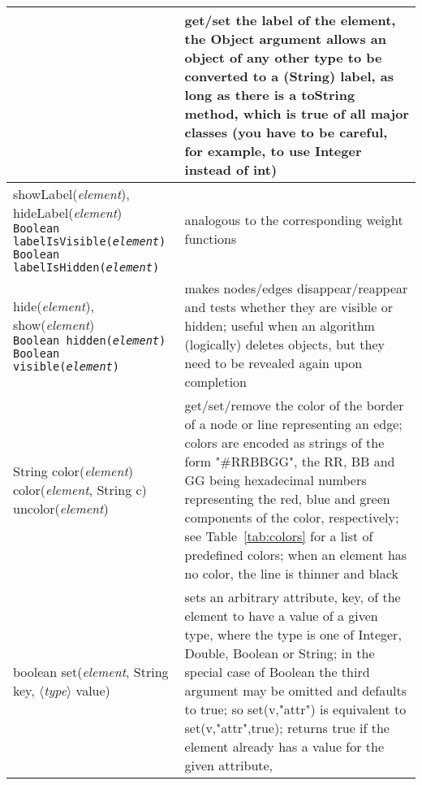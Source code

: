 \begin{table}
\begin{tabular}{| m{} | m{} |}
{    }
    &
    get/set the label of the element, the \textsf{Object} argument allows an object
    of any other type to be converted to a (\textsf{String}) label,
    as long as there is a \textsf{toString} method, which is true of all major classes
    (you have to be careful, for example, to use \textsf{Integer} instead of \textsf{int})
    \\ \hline
    \shortstack[l]{
      \textsf{showLabel(\emph{element})},
      \textsf{hideLabel(\emph{element})}\\
      \texttt{Boolean labelIsVisible(\emph{element})}\\
      \texttt{Boolean labelIsHidden(\emph{element})}
    }
    &
    analogous to the corresponding weight functions
    \\ \hline
    \shortstack[l]{
      \textsf{hide(\emph{element})},
      \textsf{show(\emph{element})}\\
      \texttt{Boolean hidden(\emph{element})}\\
      \texttt{Boolean visible(\emph{element})}
    }
    &
    makes nodes/edges disappear/reappear and tests whether they are visible or hidden; useful when an algorithm (logically) deletes objects, but they need to be revealed again upon completion
    \\ \hline
     \shortstack[l]{
      \textsf{String color(\emph{element})}\\
      \textsf{color(\emph{element}, String c)}\\
      \textsf{uncolor(\emph{element})}
    }
    &
    get/set/remove the color of the border of a node or line representing an edge;
    colors are encoded as strings of the form
    \textsf{"\#RRBBGG"}, the RR, BB and GG being hexadecimal numbers representing the
    red, blue and green components of the color, respectively; see Table~\ref{tab:colors}
    for a list of predefined colors;
    when an element has no color, the line is thinner and black
    \\ \hline
    \textsf{boolean set(\emph{element}, String key, $\langle$\emph{type}$\rangle$ value)}
    &
    sets an arbitrary attribute, \textsf{key}, of the element to have a value of a given type, where
    the type is one of \textsf{Integer}, \textsf{Double}, \textsf{Boolean}
    or \textsf{String};
    in the special case of \textsf{Boolean} the third argument may be omitted
    and defaults to \textsf{true};
    so \textsf{set(v,"attr")} is equivalent to \textsf{set(v,"attr",true)};
    returns \textsf{true} if the element already has a value for the given attribute,

\end{tabular}
\end{table}
